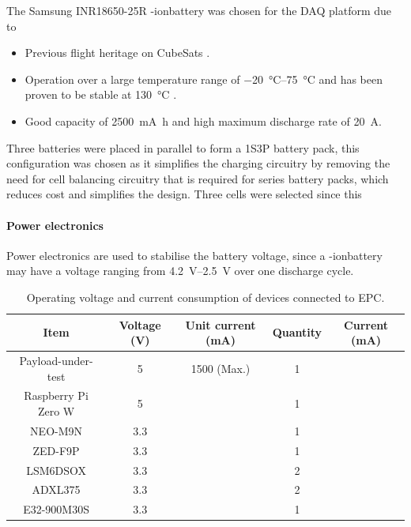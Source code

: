 \documentclass[a4paper,11pt]{article}
\newcommand{\liion}{\ce{Li}-ion}
\begin{document}
The Samsung INR18650-25R \liion battery was chosen for the DAQ platform due to
\begin{itemize}
  \item Previous flight heritage on CubeSats \cite{marcelino2021orbit}.
  \item Operation over a large temperature range of \SIrange{-20}{75}{\degreeCelsius} and has been proven to be stable at \SI{130}{\degreeCelsius} \cite{samsung2014}.
  \item Good capacity of \SI{2500}{\milli\ampere\hour} and high maximum discharge rate of \SI{20}{\ampere}.
\end{itemize}

Three batteries were placed in parallel to form a 1S3P battery pack, this configuration was chosen as it simplifies the charging circuitry by removing the need for cell balancing circuitry that is required for series battery packs, which reduces cost and simplifies the design. Three cells were selected since this %

\paragraph{Power electronics} Power electronics are used to stabilise the battery voltage, since a \liion battery may have a voltage ranging from \SIrange{4.2}{2.5}{\volt} over one discharge cycle.

\begin{table}[H]
\centering
\begin{tabular}{|c|c|c|c|c|}
  \hline
  \textbf{Item}  & \textbf{Voltage (\si{\volt})} & \textbf{Unit current (\si{\milli\ampere})} & \textbf{Quantity} & \textbf{Current (\si{\milli\ampere})} \\
  \hline
  Payload-under-test & 5 & 1500 (Max.) & 1 & \\
  Raspberry Pi Zero W & 5 & & 1 & \\
  NEO-M9N & 3.3 & & 1 & \\
  ZED-F9P & 3.3 & & 1 & \\
  LSM6DSOX & 3.3 & & 2 & \\
  ADXL375 & 3.3 & & 2 & \\
  E32-900M30S & 3.3 & & 1 & \\
  \hline

\end{tabular}
\caption{Operating voltage and current consumption of devices connected to EPC.}
\label{tabl:epc-power-budget}
\end{table}
\end{document}

